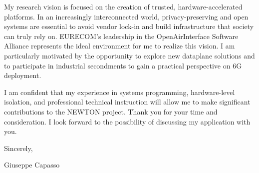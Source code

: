 \documentclass[11pt,a4paper]{article}
\begin{document}
My research vision is focused on the creation of trusted, hardware-accelerated platforms. In an increasingly interconnected world, privacy-preserving and open systems are essential to avoid vendor lock-in and build infrastructure that society can truly rely on. EURECOM’s leadership in the OpenAirInterface Software Alliance represents the ideal environment for me to realize this vision. I am particularly motivated by the opportunity to explore new dataplane solutions and to participate in industrial secondments to gain a practical perspective on 6G deployment.

I am confident that my experience in systems programming, hardware-level isolation, and professional technical instruction will allow me to make significant contributions to the NEWTON project. Thank you for your time and consideration. I look forward to the possibility of discussing my application with you.

\vspace{0.5cm}

Sincerely,

\vspace{0.5cm}

\hfill Giuseppe Capasso
\end{document}
